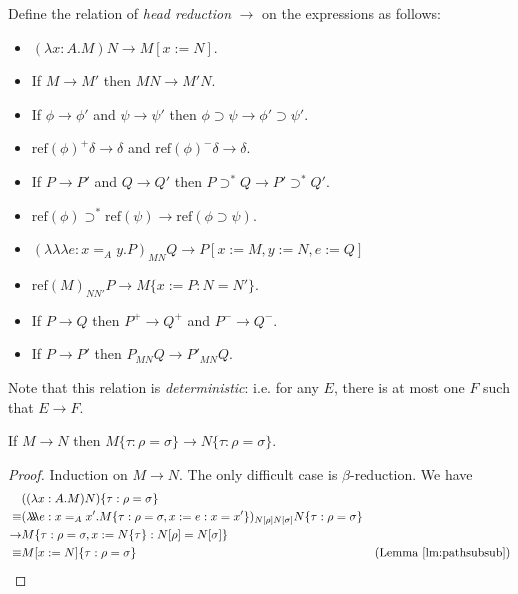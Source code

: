 \documentclass[a4paper,UKenglish]{lipics-v2016}
\newcommand*{\reff}[1]{\ensuremath{\mathrm{ref} \left( {#1} \right)}}
\newcommand*{\triplelambda}{\ensuremath{\lambda \!\! \lambda \!\! \lambda}}
\theoremstyle{plain}
\begin{document}
\begin{definition}
Define the relation of \emph{head reduction} $\rightarrow$ on the expressions as follows:
\begin{itemize}
\item
$(\lambda x:A.M)N \rightarrow M[x:=N]$.
\item
If $M \rightarrow M'$ then $MN \rightarrow M'N$.
\item
If $\phi \rightarrow \phi'$ and $\psi \rightarrow \psi'$ then $\phi \supset \psi \rightarrow \phi' \supset \psi'$.
\item
$\reff{\phi}^+ \delta \rightarrow \delta$ and $\reff{\phi}^- \delta \rightarrow \delta$.
\item
If $P \rightarrow P'$ and $Q \rightarrow Q'$ then $P \supset^* Q \rightarrow P' \supset^* Q'$.
\item
$\reff{\phi} \supset^* \reff{\psi} \rightarrow \reff{\phi \supset \psi}$.
\item
$(\triplelambda e : x =_A y . P)_{MN} Q \rightarrow P [ x := M, y := N, e := Q ]$
\item
$\reff{M}_{N N'} P \rightarrow M \{ x:= P : N = N' \}$.
\item
If $P \rightarrow Q$ then $P^+ \rightarrow Q^+$ and $P^- \rightarrow Q^-$.
\item
If $P \rightarrow P'$ then $P_{MN} Q \rightarrow P'_{MN} Q$.
\end{itemize}
\end{definition}

Note that this relation is \emph{deterministic}: i.e. for any $E$, there is at most one $F$ such that $E \rightarrow F$.

\begin{lemma}
If $M \rightarrow N$ then $M \{ \tau : \rho = \sigma \} \rightarrow N \{ \tau : \rho = \sigma \}$.
\end{lemma}

\begin{proof}
Induction on $M \rightarrow N$.  The only difficult case is $\beta$-reduction.  We have
\begin{align*}
& ((\lambda x:A.M)N)\{ \tau : \rho = \sigma \} \\
\equiv & (\triplelambda e : x =_A x' . M \{ \tau : \rho = \sigma, x := e : x = x' \})_{N [ \rho ] N [ \sigma ]} N \{ \tau : \rho = \sigma \} \\
\rightarrow & M \{ \tau : \rho = \sigma, x := N \{ \tau \} : N [ \rho ] = N [ \sigma ] \} \\
\equiv & M [ x := N ] \{ \tau : \rho = \sigma \} & (\text{Lemma \ref{lm:pathsubsub}})
\end{align*}
\end{proof}
\end{document}
